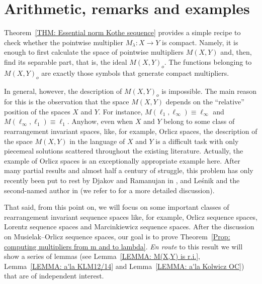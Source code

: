 \documentclass[11pt]{amsart}
\theoremstyle{definition}
\theoremstyle{definition}
\theoremstyle{definition}
\theoremstyle{definition}
\theoremstyle{definition}
\theoremstyle{definition}
\theoremstyle{definition}
\theoremstyle{definition}
\numberwithin{equation}{section}
\numberwithin{equation}{section}
\numberwithin{equation}{section}
\theoremstyle{definition}
\theoremstyle{definition}
\theoremstyle{definition}
\theoremstyle{definition}
\theoremstyle{definition}
\theoremstyle{definition}
\begin{document}
\section{{\bf Arithmetic, remarks and examples}} \label{SECTION: examples}

Theorem~\ref{THM: Essential norm Kothe sequence} provides a simple recipe to check whether
the pointwise multiplier $M_{\lambda} \colon X \rightarrow Y$ is compact.
Namely, it is enough to first calculate the space of pointwise multipliers $M(X,Y)$ and, then,
find its separable part, that is, the ideal $M(X,Y)_o$.
The functions belonging to $M(X,Y)_o$ are exactly those symbols that generate compact multipliers.

In general, however, the description of $M(X,Y)_o$ is impossible.
The main reason for this is the observation that the space $M(X,Y)$ depends on the \enquote{relative}
position of the spaces $X$ and $Y$. For instance, $M(\ell_1,\ell_{\infty}) \equiv \ell_{\infty}$
and $M(\ell_{\infty},\ell_{1}) \equiv \ell_{1}$.
Anyhow, even when $X$ and $Y$ belong to some class of rearrangement invariant spaces, like, for example,
Orlicz spaces, the description of the space $M(X,Y)$ in the language of $X$ and $Y$ is a difficult task
with only piecemeal solutions scattered throughout the existing literature.
Actually, the example of Orlicz spaces is an exceptionally appropriate example here.
After many partial results and almost half a century of struggle, this problem has only recently been
put to rest by Djakov and Ramanujan in \cite{DR00}, and Le{\' s}nik and the second-named author in \cite{LT17}
(we refer to \cite{LT17} for a more detailed discussion).

That said, from this point on, we will focus on some important classes of rearrangement invariant sequence
spaces like, for example, Orlicz sequence spaces, Lorentz sequence spaces and Marcinkiewicz sequence spaces.
After the discussion on Musielak--Orlicz sequence spaces, our goal is to prove Theorem~\ref{Prop: computing multipliers from m and to lambda}.
{\it En route} to this result we will show a series of lemmas (see Lemma~\ref{LEMMA: M(X,Y) is r.i.}, Lemma~\ref{LEMMA: a'la KLM12/14}
and Lemma~\ref{LEMMA: a'la Kolwicz OC}) that are of independent interest.
\end{document}
